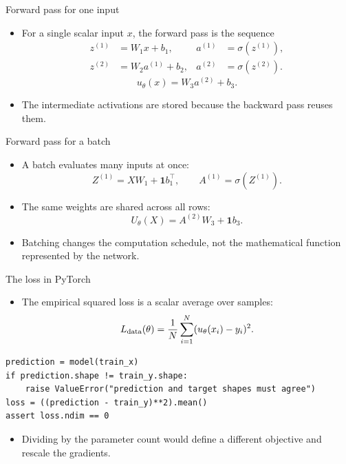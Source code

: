 \documentclass[aspectratio=43,11pt]{beamer}
\newcommand{\slideid}{L2}
\newenvironment{slideitems}{\small\begin{itemize}\setlength\itemsep{0.45em}}{\end{itemize}}
\begin{document}
\renewcommand{\slideid}{L2-S42}
\begin{frame}[t]{Forward pass for one input}
\begin{slideitems}
\item For a single scalar input $x$, the forward pass is the sequence
\[
\begin{aligned}
z^{(1)}&=W_1x+b_1, & a^{(1)}&=\sigma(z^{(1)}),\\
z^{(2)}&=W_2a^{(1)}+b_2, & a^{(2)}&=\sigma(z^{(2)}).
\end{aligned}
\]
\[
u_\theta(x)=W_3a^{(2)}+b_3.
\]
\item The intermediate activations are stored because the backward pass reuses them.
\end{slideitems}
\end{frame}

\renewcommand{\slideid}{L2-S43}
\begin{frame}[t]{Forward pass for a batch}
\begin{slideitems}
\item A batch evaluates many inputs at once:
\[
Z^{(1)}=XW_1+\mathbf 1 b_1^\top,
\qquad A^{(1)}=\sigma(Z^{(1)}).
\]
\item The same weights are shared across all rows:
\[
U_\theta(X)=A^{(2)}W_3+\mathbf 1 b_3.
\]
\item Batching changes the computation schedule, not the mathematical function represented by the network.
\end{slideitems}
\end{frame}

\renewcommand{\slideid}{L2-S44}
\begin{frame}[fragile,t]{The loss in PyTorch}
\begin{slideitems}
\item The empirical squared loss is a scalar average over samples:
\[
L_{\rm data}(\theta)=\frac1N\sum_{i=1}^N (u_\theta(x_i)-y_i)^2.
\]
\end{slideitems}
\begin{lstlisting}
prediction = model(train_x)
if prediction.shape != train_y.shape:
    raise ValueError("prediction and target shapes must agree")
loss = ((prediction - train_y)**2).mean()
assert loss.ndim == 0
\end{lstlisting}
\begin{slideitems}
\item Dividing by the parameter count would define a different objective and rescale the gradients.
\end{slideitems}
\end{frame}
\end{document}
